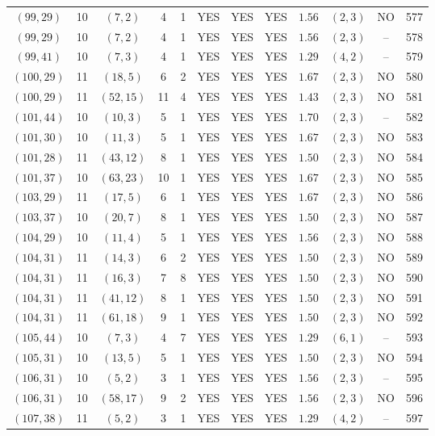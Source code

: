\begin{longtable}{|c|c|c|c|c|c|c|c|c|c|c|c|}
$(99,29)$ & 10 & $(7,2)$ & 4 & 1 & YES & YES & YES & $1.56$ & $(2,3)$ & NO & 577\\
$(99,29)$ & 10 & $(7,2)$ & 4 & 1 & YES & YES & YES & $1.56$ & $(2,3)$ & -- & 578\\
$(99,41)$ & 10 & $(7,3)$ & 4 & 1 & YES & YES & YES & $1.29$ & $(4,2)$ & -- & 579\\
$(100,29)$ & 11 & $(18,5)$ & 6 & 2 & YES & YES & YES & $1.67$ & $(2,3)$ & NO & 580\\
$(100,29)$ & 11 & $(52,15)$ & 11 & 4 & YES & YES & YES & $1.43$ & $(2,3)$ & NO & 581\\
$(101,44)$ & 10 & $(10,3)$ & 5 & 1 & YES & YES & YES & $1.70$ & $(2,3)$ & -- & 582\\
$(101,30)$ & 10 & $(11,3)$ & 5 & 1 & YES & YES & YES & $1.67$ & $(2,3)$ & NO & 583\\
$(101,28)$ & 11 & $(43,12)$ & 8 & 1 & YES & YES & YES & $1.50$ & $(2,3)$ & NO & 584\\
$(101,37)$ & 10 & $(63,23)$ & 10 & 1 & YES & YES & YES & $1.67$ & $(2,3)$ & NO & 585\\
$(103,29)$ & 11 & $(17,5)$ & 6 & 1 & YES & YES & YES & $1.67$ & $(2,3)$ & NO & 586\\
$(103,37)$ & 10 & $(20,7)$ & 8 & 1 & YES & YES & YES & $1.50$ & $(2,3)$ & NO & 587\\
$(104,29)$ & 10 & $(11,4)$ & 5 & 1 & YES & YES & YES & $1.56$ & $(2,3)$ & NO & 588\\
$(104,31)$ & 11 & $(14,3)$ & 6 & 2 & YES & YES & YES & $1.50$ & $(2,3)$ & NO & 589\\
$(104,31)$ & 11 & $(16,3)$ & 7 & 8 & YES & YES & YES & $1.50$ & $(2,3)$ & NO & 590\\
$(104,31)$ & 11 & $(41,12)$ & 8 & 1 & YES & YES & YES & $1.50$ & $(2,3)$ & NO & 591\\
$(104,31)$ & 11 & $(61,18)$ & 9 & 1 & YES & YES & YES & $1.50$ & $(2,3)$ & NO & 592\\
$(105,44)$ & 10 & $(7,3)$ & 4 & 7 & YES & YES & YES & $1.29$ & $(6,1)$ & -- & 593\\
$(105,31)$ & 10 & $(13,5)$ & 5 & 1 & YES & YES & YES & $1.50$ & $(2,3)$ & NO & 594\\
$(106,31)$ & 10 & $(5,2)$ & 3 & 1 & YES & YES & YES & $1.56$ & $(2,3)$ & -- & 595\\
$(106,31)$ & 10 & $(58,17)$ & 9 & 2 & YES & YES & YES & $1.56$ & $(2,3)$ & NO & 596\\
$(107,38)$ & 11 & $(5,2)$ & 3 & 1 & YES & YES & YES & $1.29$ & $(4,2)$ & -- & 597\\

\end{longtable}
